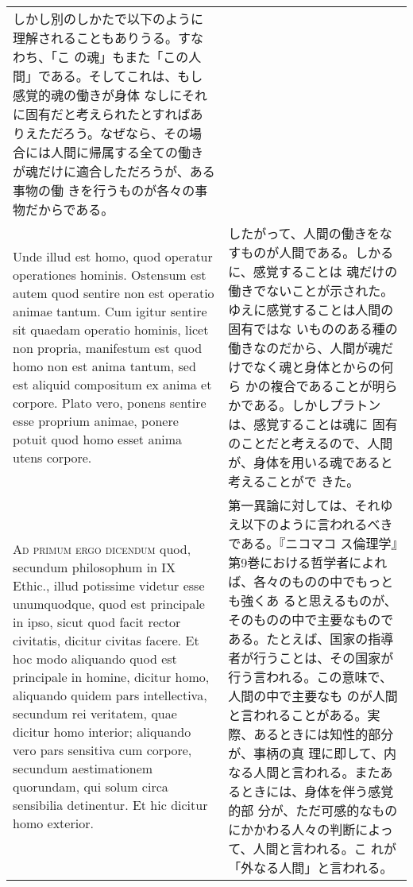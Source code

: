 \documentclass[10pt]{jsarticle} %
\begin{document}
\begin{longtable}{p{21em}p{21em}}
しかし別のしかたで以下のように理解されることもありうる。すなわち、「こ
の魂」もまた「この人間」である。そしてこれは、もし感覚的魂の働きが身体
なしにそれに固有だと考えられたとすればありえただろう。なぜなら、その場
合には人間に帰属する全ての働きが魂だけに適合しただろうが、ある事物の働
きを行うものが各々の事物だからである。


\\


Unde illud est homo, quod operatur operationes hominis. Ostensum est
autem quod sentire non est operatio animae tantum. Cum igitur sentire
sit quaedam operatio hominis, licet non propria, manifestum est quod
homo non est anima tantum, sed est aliquid compositum ex anima et
corpore. Plato vero, ponens sentire esse proprium animae, ponere
potuit quod homo esset anima utens corpore.


&

したがって、人間の働きをなすものが人間である。しかるに、感覚することは
魂だけの働きでないことが示された。ゆえに感覚することは人間の固有ではな
いもののある種の働きなのだから、人間が魂だけでなく魂と身体とからの何ら
かの複合であることが明らかである。しかしプラトンは、感覚することは魂に
固有のことだと考えるので、人間が、身体を用いる魂であると考えることがで
きた。

\\



{\scshape Ad primum ergo dicendum} quod, secundum philosophum in IX
Ethic., illud potissime videtur esse unumquodque, quod est principale
in ipso, sicut quod facit rector civitatis, dicitur civitas facere. Et
hoc modo aliquando quod est principale in homine, dicitur homo,
aliquando quidem pars intellectiva, secundum rei veritatem, quae
dicitur homo interior; aliquando vero pars sensitiva cum corpore,
secundum aestimationem quorundam, qui solum circa sensibilia
detinentur. Et hic dicitur homo exterior.


&

第一異論に対しては、それゆえ以下のように言われるべきである。『ニコマコ
ス倫理学』第9巻における哲学者によれば、各々のものの中でもっとも強くあ
ると思えるものが、そのものの中で主要なものである。たとえば、国家の指導
者が行うことは、その国家が行う言われる。この意味で、人間の中で主要なも
のが人間と言われることがある。実際、あるときには知性的部分が、事柄の真
理に即して、内なる人間と言われる。またあるときには、身体を伴う感覚的部
分が、ただ可感的なものにかかわる人々の判断によって、人間と言われる。こ
れが「外なる人間」と言われる。


\end{longtable}
\end{document}
